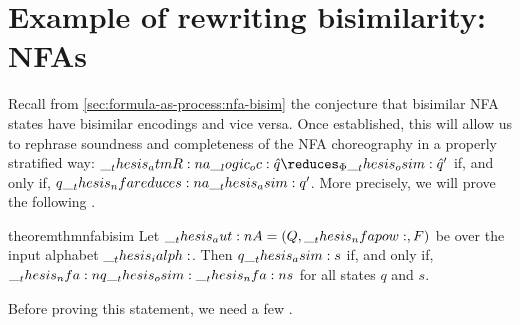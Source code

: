 \clearpage
\section{Example of rewriting bisimilarity: \Aclp*{NFA}}\label{sec:ordered-bisimilarity:nfa}

Recall from \cref{sec:formula-as-process:nfa-bisim} the conjecture that bisimilar \ac{NFA} states have bisimilar encodings and vice versa.
Once established, this will allow us to rephrase soundness and completeness of the \ac{NFA} choreography in a properly stratified way: $\atmR{a} \oc \defp{q} \reduces_{\orsig}\osim \defp{q}'$ if, and only if, $q \nfareduces[a]\asim q'$.
More precisely, we will prove the following .
\begin{restatable*}[
  label=thm:nfa-bisim-osim
]{theorem}{thmnfabisim}
  Let $\__thesis_aut:n {A} = (Q, \__thesis_nfapow:, F)$ be  over the input alphabet $\__thesis_ialph:$.
  Then $q \__thesis_asim: s$ if, and only if, $\__thesis_nfa:n {q} \__thesis_osim: \__thesis_nfa:n {s}$ for all states $q$ and $s$.
\end{restatable*}
\noindent
Before proving this statement, we need a few .
%

%

